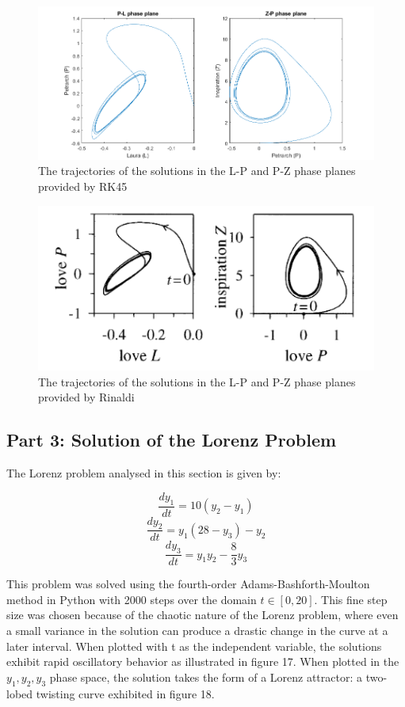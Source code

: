 \documentclass[11pt]{article}
\begin{document}
\begin{figure} [!h]
\centering
        \includegraphics[totalheight=5cm]{evol2.png}
    \caption{The trajectories of the solutions in the L-P and P-Z phase planes provided by RK45}
    \label{figure15}
\end{figure}

\newpage

\begin{figure} [!h]
\centering
        \includegraphics[totalheight=5.5cm]{pic1.png}
    \caption{The trajectories of the solutions in the L-P and P-Z phase planes provided by Rinaldi}
    \label{figure16}
\end{figure}

\subsection{Part 3: Solution of the Lorenz Problem}
%
The Lorenz problem analysed in this section is given by: 

$$\frac{dy_{1}}{dt}=10(y_{2}-y_{1})$$
$$\frac{dy_{2}}{dt}=y_{1}(28-y_{3})-y_{2}$$
$$\frac{dy_{3}}{dt}=y_{1}y_{2}-\frac{8}{3}y_{3}$$

This problem was solved using the fourth-order Adams-Bashforth-Moulton method in
Python with 2000 steps over the domain $t\in [0,20]$. This fine step size was chosen
because of the chaotic nature of the Lorenz problem, where even a small variance
in the solution can produce a drastic change in the curve at a later interval. 
When plotted with t as the independent variable, the solutions exhibit rapid 
oscillatory behavior as illustrated in figure 17. When plotted in the 
$y_{1}, y_{2}, y_{3}$ phase space, the solution takes the form of a Lorenz attractor:
a two-lobed twisting curve exhibited in figure 18.
\end{document}
